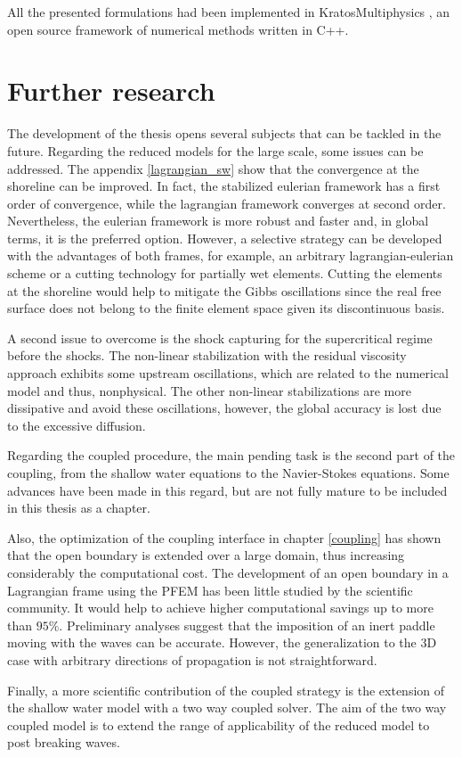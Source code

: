 All the presented formulations had been implemented in KratosMultiphysics \cite{dadvand2010, dadvand2013}, an open source framework of numerical methods written in C++.



\section{Further research}


The development of the thesis opens several subjects that can be tackled in the future.
Regarding the reduced models for the large scale, some issues can be addressed. The appendix \ref{lagrangian_sw} show that the convergence at the shoreline can be improved. In fact, the stabilized eulerian framework has a first order of convergence, while the lagrangian framework converges at second order. Nevertheless, the eulerian framework is more robust and faster and, in global terms, it is the preferred option. However, a selective strategy can be developed with the advantages of both frames, for example, an arbitrary lagrangian-eulerian scheme or a cutting technology for partially wet elements. Cutting the elements at the shoreline would help to mitigate the Gibbs oscillations since the real free surface does not belong to the finite element space given its discontinuous basis.

A second issue to overcome is the shock capturing for the supercritical regime before the shocks. The non-linear stabilization with the residual viscosity approach exhibits some upstream oscillations, which are related to the numerical model and thus, nonphysical. The other non-linear stabilizations are more dissipative and avoid these oscillations, however, the global accuracy is lost due to the excessive diffusion.

Regarding the coupled procedure, the main pending task is the second part of the coupling, from the shallow water equations to the Navier-Stokes equations. Some advances have been made in this regard, but are not fully mature to be included in this thesis as a chapter.

Also, the optimization of the coupling interface in chapter \ref{coupling} has shown that the open boundary is extended over a large domain, thus increasing considerably the computational cost. The development of an open boundary in a Lagrangian frame using the PFEM has been little studied by the scientific community. It would help to achieve higher computational savings up to more than $95\%$. Preliminary analyses suggest that the imposition of an inert paddle moving with the waves can be accurate. However, the generalization to the 3D case with arbitrary directions of propagation is not straightforward.

Finally, a more scientific contribution of the coupled strategy is the extension of the shallow water model with a two way coupled solver. The aim of the two way coupled model is to extend the range of applicability of the reduced model to post breaking waves.

